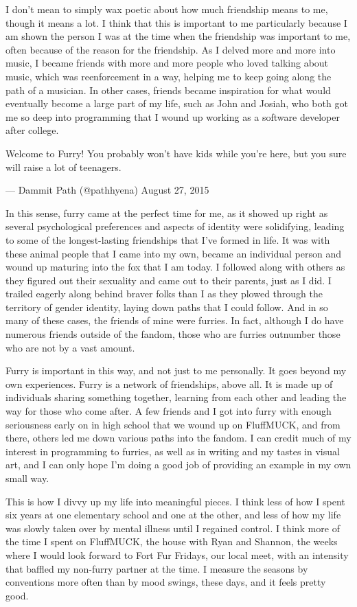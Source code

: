 I don't mean to simply wax poetic about how much friendship means to me, though it means a lot. I think that this is important to me particularly because I am shown the person I was at the time when the friendship was important to me, often because of the reason for the friendship. As I delved more and more into music, I became friends with more and more people who loved talking about music, which was reenforcement in a way, helping me to keep going along the path of a musician. In other cases, friends became inspiration for what would eventually become a large part of my life, such as John and Josiah, who both got me so deep into programming that I wound up working as a software developer after college.

Welcome to Furry! You probably won't have kids while you're here, but you sure will raise a lot of teenagers.

--- Dammit Path (@pathhyena) August 27, 2015

In this sense, furry came at the perfect time for me, as it showed up right as several psychological preferences and aspects of identity were solidifying, leading to some of the longest-lasting friendships that I've formed in life. It was with these animal people that I came into my own, became an individual person and wound up maturing into the fox that I am today. I followed along with others as they figured out their sexuality and came out to their parents, just as I did. I trailed eagerly along behind braver folks than I as they plowed through the territory of gender identity, laying down paths that I could follow. And in so many of these cases, the friends of mine were furries. In fact, although I do have numerous friends outside of the fandom, those who are furries outnumber those who are not by a vast amount.

Furry is important in this way, and not just to me personally. It goes beyond my own experiences. Furry is a network of friendships, above all. It is made up of individuals sharing something together, learning from each other and leading the way for those who come after. A few friends and I got into furry with enough seriousness early on in high school that we wound up on FluffMUCK, and from there, others led me down various paths into the fandom. I can credit much of my interest in programming to furries, as well as in writing and my tastes in visual art, and I can only hope I'm doing a good job of providing an example in my own small way.

This is how I divvy up my life into meaningful pieces. I think less of how I spent six years at one elementary school and one at the other, and less of how my life was slowly taken over by mental illness until I regained control. I think more of the time I spent on FluffMUCK, the house with Ryan and Shannon, the weeks where I would look forward to Fort Fur Fridays, our local meet, with an intensity that baffled my non-furry partner at the time. I measure the seasons by conventions more often than by mood swings, these days, and it feels pretty good.

